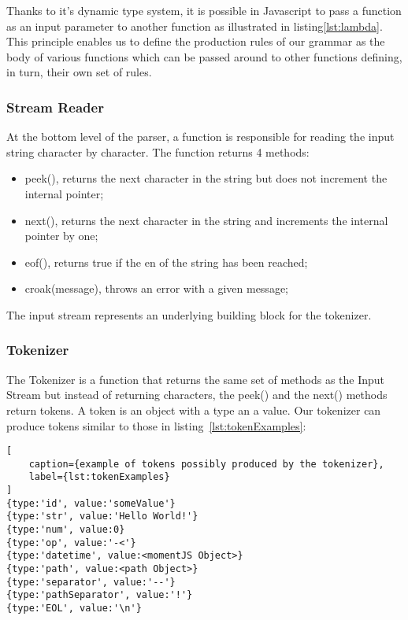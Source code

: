 Thanks to it's dynamic type system, it is possible in Javascript to pass a function as an input parameter to another function as illustrated in listing\ref{lst:lambda}. This principle enables us to define the production rules of our grammar as the body of various functions which can be passed around to other functions defining, in turn, their own set of rules.

\subsubsection{Stream Reader}

At the bottom level of the parser, a function is responsible for reading the input string character by character. The function returns 4 methods:

\begin{itemize}
    \item peek(), returns the next character in the string but does not increment the internal pointer;
    \item next(), returns the next character in the string and increments the internal pointer by one;
    \item eof(), returns true if the en of the string has been reached;
    \item croak(message), throws an error with a given message;
\end{itemize}

The input stream represents an underlying building block for the tokenizer.

\subsubsection{Tokenizer}

The Tokenizer is a function that returns the same set of methods as the Input Stream but instead of returning characters, the peek() and the next() methods return tokens. A token is an object with a type an a value. Our tokenizer can produce tokens similar to those in listing~\ref{lst:tokenExamples}:

\begin{lstlisting}[
    caption={example of tokens possibly produced by the tokenizer},
    label={lst:tokenExamples}
]
{type:'id', value:'someValue'}
{type:'str', value:'Hello World!'}
{type:'num', value:0}
{type:'op', value:'-<'}
{type:'datetime', value:<momentJS Object>}
{type:'path', value:<path Object>}
{type:'separator', value:'--'}
{type:'pathSeparator', value:'!'}
{type:'EOL', value:'\n'}
\end{lstlisting}

